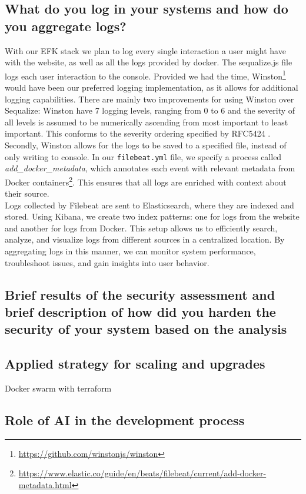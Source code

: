 \documentclass[11pt]{article}
\begin{document}
\subsection{What do you log in your systems and how do you aggregate logs?}
With our EFK stack we plan to log every single interaction a user might have with the website, as well as all the logs provided by docker. The sequalize.js file logs each user interaction to the console. Provided we had the time, Winston\footnote{\url{https://github.com/winstonjs/winston}} would have been our preferred logging implementation, as it allows for additional logging capabilities. There are mainly two improvements for using Winston over Sequalize: Winston have 7 logging levels, ranging from 0 to 6 and the severity of all levels is assumed to be numerically ascending from most important to least important. This conforms to the severity ordering specified by RFC5424 \citep{rfc5424}. Secondly, Winston allows for the logs to be saved to a specified file, instead of only writing to console. 
In our \texttt{filebeat.yml} file, we specify a process called \textit{add\_docker\_metadata}, which annotates each event with relevant metadata from Docker containers\footnote{\url{https://www.elastic.co/guide/en/beats/filebeat/current/add-docker-metadata.html}}. This ensures that all logs are enriched with context about their source.\\
Logs collected by Filebeat are sent to Elasticsearch, where they are indexed and stored. Using Kibana, we create two index patterns: one for logs from the website and another for logs from Docker. This setup allows us to efficiently search, analyze, and visualize logs from different sources in a centralized location. By aggregating logs in this manner, we can monitor system performance, troubleshoot issues, and gain insights into user behavior. 






\subsection{Brief results of the security assessment and brief description of how did you harden the security of your system based on the analysis}


\subsection{Applied strategy for scaling and upgrades}
Docker swarm with terraform
\subsection{Role of AI in the development process}
\end{document}
